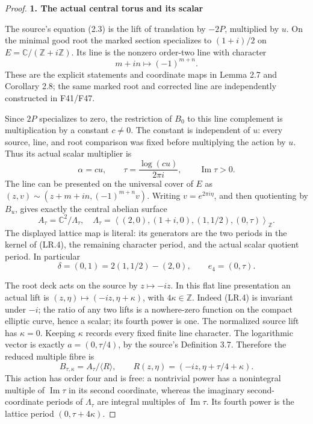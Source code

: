 \begin{proof}
\par

\medskip\noindent\textbf{1. The actual central torus and its scalar}

\par\nobreak

The source's equation (2.3) is the lift of translation by
\(-2P\), multiplied by \(u\). On the minimal good root the marked
section specializes to \((1+i)/2\) on
\(E=\mathbb C/(\mathbb Z+i\mathbb Z)\). Its line is the nonzero
order-two line with character
\[
                  m+in\longmapsto(-1)^{m+n}.          \tag{LR.4}
\]
These are the explicit statements and coordinate maps in Lemma 2.7 and Corollary 2.8; the same marked root
and corrected line are independently constructed in F41/F47.

Since \(2P\) specializes to zero, the restriction of \(B_0\) to
this line complement is multiplication by a constant \(c\ne0\).
The constant is independent of \(u\): every source, line, and root
comparison was fixed before multiplying the action by \(u\).
Thus its actual scalar multiplier is
\[
              \alpha=cu,\qquad
              \tau=\frac{\log(cu)}{2\pi i},
              \qquad\operatorname{Im}\tau>0.         \tag{LR.5}
\]
The line can be presented on the universal cover of \(E\) as
\((z,v)\sim(z+m+in,(-1)^{m+n}v)\). Writing
\(v=e^{2\pi i\eta}\), and then quotienting by \(B_u\), gives
exactly the central abelian surface
\[
 A_\tau=\mathbb C^2/\Lambda_\tau,
 \quad
 \Lambda_\tau=
 \left\langle
  (2,0),(1+i,0),(1,1/2),(0,\tau)
 \right\rangle_{\mathbb Z}.                           \tag{LR.6}
\]
The displayed lattice map is literal: its generators are the two
periods in the kernel of (LR.4), the remaining character period,
and the actual scalar quotient period. In particular
\[
 \delta=(0,1)=2(1,1/2)-(2,0),\qquad e_4=(0,\tau).
\]

The root deck acts on the source by \(z\mapsto-iz\). In this flat
line presentation an actual lift is
\((z,\eta)\mapsto(-iz,\eta+\kappa)\), with
\(4\kappa\in\mathbb Z\). Indeed (LR.4) is invariant under
\(-i\); the ratio of any two lifts is a nowhere-zero function on
the compact elliptic curve, hence a scalar; its fourth power is one.
The normalized source lift has \(\kappa=0\). Keeping \(\kappa\)
records every fixed finite line character. The logarithmic vector
is exactly \(a=(0,\tau/4)\), by the source's Definition 3.7. Therefore the reduced multiple fibre is
\[
 B_{\tau,\kappa}=A_\tau/\langle R\rangle,
 \qquad R(z,\eta)=(-iz,\eta+\tau/4+\kappa).           \tag{LR.7}
\]
This action has order four and is free: a nontrivial power has a
nonintegral multiple of \(\operatorname{Im}\tau\) in its second
coordinate, whereas the imaginary second-coordinate periods of
\(\Lambda_\tau\) are integral multiples of
\(\operatorname{Im}\tau\). Its fourth power is the lattice period
\((0,\tau+4\kappa)\).


\end{proof}
